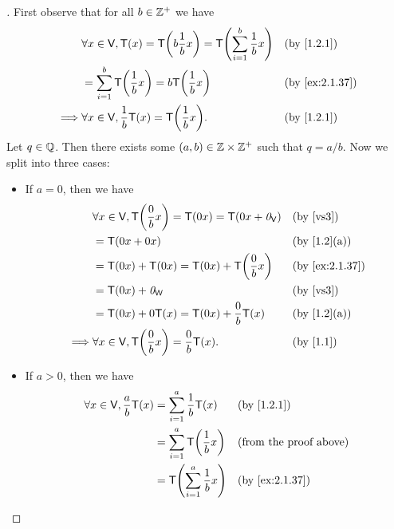 \begin{proof}[]
  First observe that for all \(b \in \mathbb{Z}^+\) we have
  \begin{align*}
             & \forall x \in \V, \T(x) = \T\pa{b \frac{1}{b} x} = \T\pa{\sum_{i = 1}^b \frac{1}{b} x} &  & \text{(by \cref{1.2.1})}     \\
             & = \sum_{i = 1}^b \T\pa{\frac{1}{b} x} = b \T\pa{\frac{1}{b} x}                         &  & \text{(by \cref{ex:2.1.37})} \\
    \implies & \forall x \in \V, \frac{1}{b} \T(x) = \T\pa{\frac{1}{b} x}.                            &  & \text{(by \cref{1.2.1})}
  \end{align*}
  Let \(q \in \mathbb{Q}\).
  Then there exists some \((a, b) \in \mathbb{Z} \times \mathbb{Z}^+\) such that \(q = a / b\).
  Now we split into three cases:
  \begin{itemize}
    \item If \(a = 0\), then we have
          \begin{align*}
                     & \forall x \in \V, \T\pa{\frac{0}{b} x} = \T(0x) = \T(0x + \zv_{\V}) &  & \text{(by \ref{vs3})}        \\
                     & = \T(0x + 0x)                                                       &  & \text{(by \cref{1.2}(a))}    \\
                     & = \T(0x) + \T(0x) = \T(0x) + \T\pa{\frac{0}{b} x}                   &  & \text{(by \cref{ex:2.1.37})} \\
                     & = \T(0x) + \zv_{\W}                                                 &  & \text{(by \ref{vs3})}        \\
                     & = \T(0x) + 0 \T(x) = \T(0x) + \frac{0}{b} \T(x)                     &  & \text{(by \cref{1.2}(a))}    \\
            \implies & \forall x \in \V, \T\pa{\frac{0}{b}x} = \frac{0}{b} \T(x).          &  & \text{(by \cref{1.1})}
          \end{align*}
    \item If \(a > 0\), then we have
          \begin{align*}
            \forall x \in \V, \frac{a}{b} \T(x) & = \sum_{i = 1}^a \frac{1}{b} \T(x)    &  & \text{(by \cref{1.2.1})}      \\
                                                & = \sum_{i = 1}^a \T\pa{\frac{1}{b} x} &  & \text{(from the proof above)} \\
                                                & = \T\pa{\sum_{i = 1}^a \frac{1}{b} x} &  & \text{(by \cref{ex:2.1.37})}  \\

\end{align*}
\end{itemize}
\end{proof}

